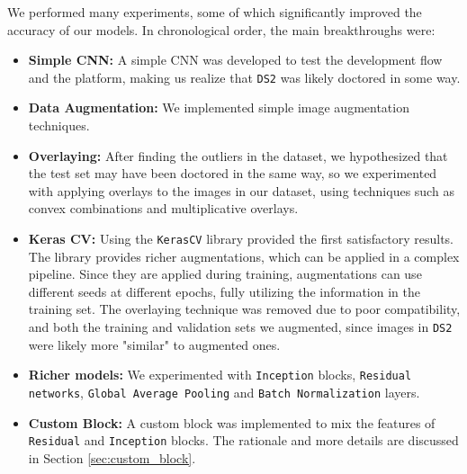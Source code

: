 \documentclass[11pt]{article}
\begin{document}
\begin{multicols}{2}
      We performed many experiments, some of which significantly improved the accuracy of our models. In chronological order, the main breakthroughs were:
      \begin{itemize}[leftmargin=*]
            \setlength\itemsep{0em}
            \item \textbf{Simple CNN:} A simple CNN was developed to test the development flow and the platform, making us realize that \texttt{DS2} was likely doctored in some way.
            \item \textbf{Data Augmentation:} We implemented simple image augmentation techniques.
            \item \textbf{Overlaying:} After finding the outliers in the dataset, we hypothesized that the test set may have been doctored in the same way, so we experimented with applying overlays to the images in our dataset, using techniques such as convex combinations and multiplicative overlays.
            \item \textbf{Keras CV:} Using the \texttt{KerasCV} library\cite{chollet2015keras} provided the first satisfactory results. The library provides richer augmentations, which can be applied in a complex pipeline. Since they are applied during training, augmentations can use different seeds at different epochs, fully utilizing the information in the training set. The overlaying technique was removed due to poor compatibility, and both the training and validation sets we augmented, since images in \texttt{DS2} were likely more "similar" to augmented ones.
            \item \textbf{Richer models:} We experimented with \texttt{In\-cep\-tion} blocks\cite{Inception}, \texttt{Re\-si\-dual net\-works}\cite{He2015DeepRL}, \texttt{Glo\-bal Aver\-age Poo\-ling} and \texttt{Batch Nor\-ma\-li\-za\-tion} layers.
            \item \textbf{Custom Block:} A custom block was implemented to mix the features of \texttt{Re\-si\-dual} and \texttt{In\-cep\-tion} blocks. The rationale and more details are discussed in Section \ref{sec:custom_block}.
      \end{itemize}


\end{multicols}
\end{document}
